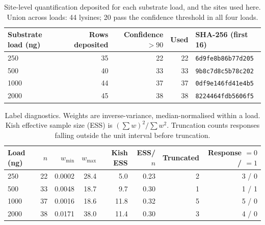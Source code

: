 \documentclass[journal=jprobs,manuscript=article,layout=traditional]{achemso}
\begin{document}
\begin{table}[htbp]
\caption{Site-level quantification deposited for each substrate load, and the sites used here. Union across loads: 44 lysines; 20 pass the confidence threshold in all four loads.}
\label{tbl:coverage}
\begin{tabular}{lrrrl}
\toprule
Substrate load (ng) & Rows deposited & Confidence $>90$ & Used & SHA-256 (first 16) \\
\midrule
250  & 35 & 22 & 22 & \texttt{6d9fe8b86b77d205} \\
500  & 40 & 33 & 33 & \texttt{9b8c7d8c5b78c202} \\
1000 & 44 & 37 & 37 & \texttt{0df9e146fd41e4b5} \\
2000 & 45 & 38 & 38 & \texttt{8224464fdb5606f5} \\
\bottomrule
\end{tabular}
\end{table}

\begin{table}[htbp]
\caption{Label diagnostics. Weights are inverse-variance, median-normalised within a load. Kish effective sample size (ESS) is $(\sum w)^2/\sum w^2$. Truncation counts responses falling outside the unit interval before truncation.}
\label{tbl:labels}
\begin{tabular}{lrrrrrrr}
\toprule
Load (ng) & $n$ & $w_{\min}$ & $w_{\max}$ & Kish ESS & ESS/$n$ & Truncated & Response $=0$ / $=1$ \\
\midrule
250  & 22 & 0.0002 & 28.4 & 5.0  & 0.23 & 2 & 3 / 0 \\
500  & 33 & 0.0048 & 18.7 & 9.7  & 0.30 & 1 & 1 / 1 \\
1000 & 37 & 0.0016 & 18.6 & 11.8 & 0.32 & 5 & 5 / 0 \\
2000 & 38 & 0.0171 & 38.0 & 11.4 & 0.30 & 3 & 4 / 0 \\
\bottomrule
\end{tabular}
\end{table}
\end{document}
